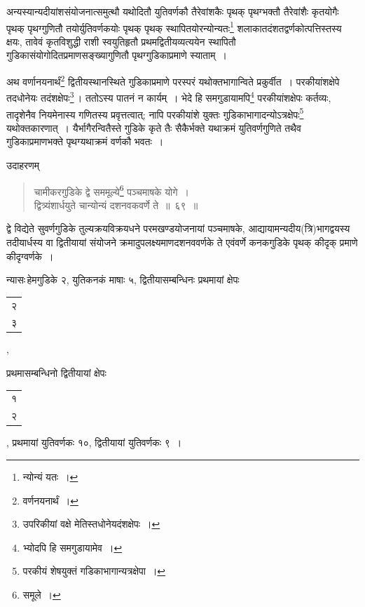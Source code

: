 \documentclass[10pt, openany]{book}
\begin{document}
{{{अन्यस्यान्यदीयांशसंयोजनात्समुत्थौ यथोदितौ युतिवर्णकौ तैरेवांशकैः पृथक्
पृथग्भक्तौ}
{तैरेवांशैः कृतयोगैः पृथक् पृथग्गुणितौ तयोर्युतिवर्णकयोः पृथक् पृथक्
स्थापितयोरन्योन्यतः\renewcommand{\thefootnote}{\s ४}\footnote{\s *न्योन्यं यतः~।}} {शलाकातदंशतद्वर्णकोत्पत्तिस्तस्य क्षयः, तावेवं कृतविशुद्धी राशी
स्वयुतिहृतौ प्रथमद्वितीयव्यत्ययेन स्थापितौ गुडिकासंयोगोदितप्रमाणसङ्ख्यागुणितौ
पृथग्गुडिकाप्रमाणे स्याताम्~।}
\vspace{3mm}

{अथ वर्णानयनार्थं\renewcommand{\thefootnote}{\s ५}\footnote{\s वर्णनयनार्थं~।}  द्वितीयस्थानस्थिते गुडिकाप्रमाणे परस्परं
यथोक्तभागान्विते}
{प्रकुर्वीत~। परकीयांशक्षेपे तदधोनेयः तदंशक्षेपः\renewcommand{\thefootnote}{\s ६}\footnote{\s उपरिकीयां वक्षे मेतिस्तधोनेयदंशक्षेपः~।}\,। ततोऽस्य पातनं न
कार्यम्~। भेदे हि समगुडायामपि\renewcommand{\thefootnote}{\s ७}\footnote{\s भ्योदपि हि समगुडायामेव~।}  परकीयांशक्षेपः कर्तव्यः, तादृशेनैव नियमेनास्य गणितस्य
प्रवृत्तत्वात्; नापि}
{परकीयांशे युक्तः गुडिकाभागादन्योऽत्रक्षेपः\renewcommand{\thefootnote}{\s ८}\footnote{\s  परकीयं शेषयुक्तं गडिकाभागान्यत्रक्षेपा~।}  यथोक्तकारणात्~।
यैर्भागैरन्वितैस्ते गुडिके कृते तैः}
{सैकैर्भक्ते यथाक्रमं युतिवर्णगुणिते तथैव गुडिकाप्रमाणभक्ते
पृथग्यथाक्रमं वर्णकौ भवतः~।}
\vspace{3mm}

{उदाहरणम्\textemdash}

\begin{quote}
    
{\eg  चामीकरगुडिके द्वे सममूल्ये\renewcommand{\thefootnote}{\s ९}\footnote{\s समूले~।}  पञ्चमाषके योगे~। \\
 द्वित्र्यंशार्धयुते चान्योन्यं दशनवकवर्णे ते~॥~६९~॥}\end{quote} 

{द्वे विद्येते सुवर्णगुडिके तुल्यक्रयविक्रयधने परमखण्डयोजनायां
पञ्चमाषके, आद्यायामन्यदीय(त्रि)भागद्वयस्य तदीयार्धस्य वा द्वितीयायां संयोजने
क्रमादुपलक्ष्यमाणदशनववर्णके ते एवंवर्णे कनकगुडिके पृथक् कीदृक् प्रमाणे कीदृग्वर्णके~।}


\newpage

{न्यासः\textendash \,हेमगुडिके २, युतिकनकं माषाः ५, द्वितीयासम्बन्धिनः प्रथमायां
क्षेपः\begin{tabular}{r}२\\ ३\end{tabular},}
{प्रथमासम्बन्धिनो द्वितीयायां क्षेपः\begin{tabular}{r}१\\ २\end{tabular}, प्रथमायां युतिवर्णकः १०,
द्वितीयायां युतिवर्णकः ९~।}

}}
\end{document}
